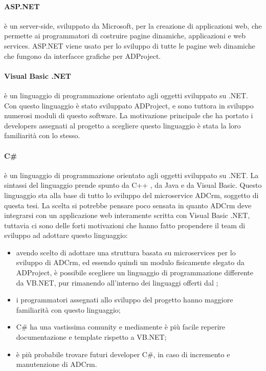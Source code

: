 \documentclass[12pt,a4paper,twoside,openany,english]{book}
\begin{document}
\paragraph{ASP.NET}
 è un  server-side, sviluppato da Microsoft, per la creazione di applicazioni web, che permette ai programmatori di costruire pagine dinamiche, applicazioni e web services.
 ASP.NET viene usato per lo sviluppo di tutte le pagine web dinamiche che fungono da interfacce grafiche per ADProject.

\paragraph{Visual Basic .NET}
è un linguaggio di programmazione orientato agli oggetti sviluppato su .NET.\\
Con questo linguaggio è stato sviluppato ADProject, e sono tuttora in sviluppo numerosi moduli di questo software. La motivazione principale che ha portato i developers assegnati al progetto a scegliere questo linguaggio è stata la loro familiarità con lo stesso. 

\paragraph{C\#}
è un linguaggio di programmazione orientato agli oggetti sviluppato su .NET.
La sintassi del linguaggio prende spunto da C++ , da Java
e da Visual Basic.
Questo linguaggio sta alla base di tutto lo sviluppo del microservice ADCrm, soggetto di questa tesi. La scelta si potrebbe pensare poco sensata in quanto ADCrm deve integrarsi con un applicazione web interamente scritta con Visual Basic .NET, tuttavia ci sono delle forti motivazioni che hanno fatto propendere il team di sviluppo ad adottare questo linguaggio:
\begin{itemize}
	\itemsep-0.5em
	\item avendo scelto di adottare una struttura basata su microservices per lo sviluppo di ADCrm, ed essendo quindi un modulo fisicamente slegato da ADProject, è possibile scegliere un linguaggio di programmazione differente da VB.NET, pur rimanendo all'interno dei linguaggi offerti dal ;
	\item i programmatori assegnati allo sviluppo del progetto hanno maggiore familiarità con questo linguaggio;
	\item C\# ha una vastissima comunity e mediamente è più facile reperire documentazione e template rispetto a VB.NET;
	\item è più probabile trovare futuri developer C\#, in caso di incremento e manutenzione di ADCrm.	
\end{itemize}
\end{document}

